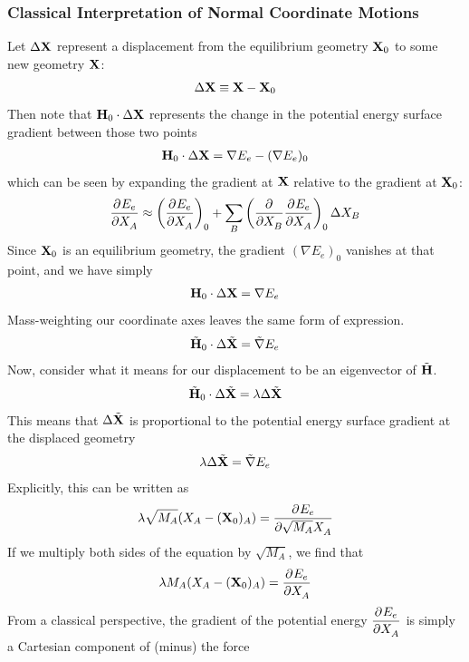 \documentclass[11pt]{article}
\begin{document}
\subsubsection{Classical Interpretation of Normal Coordinate Motions}
Let $\Delta\mathbf{X}$ represent a displacement from the equilibrium geometry
$\mathbf{X}_0$ to some new geometry $\mathbf{X}$:
\begin{align}
    \Delta\mathbf{X}
\equiv
    \mathbf{X}-\mathbf{X}_0
\end{align}
Then note that $\mathbf{H}_0\cdot\Delta\mathbf{X}$ represents the change in the potential
energy surface gradient between those two points
\begin{align*}
    \mathbf{H}_0\cdot\Delta\mathbf{X}
    = \nabla E_e - (\nabla E_e)_0
\end{align*}
which can be seen by expanding the gradient at $\mathbf{X}$ relative to the
gradient at $\mathbf{X}_0$:
\begin{align}
     \dfrac{ \partial^{} E_e }{\partial X_A ^{}}
    \approx \left( \dfrac{ \partial^{} E_e }{\partial X_A ^{}}\right)_0
            +\sum_B
            \left( \dfrac{ \partial^{}  }{\partial X_B ^{}} \dfrac{ \partial^{} E_e }{\partial X_A ^{}}\right)_0
            \Delta X_B
\end{align}
Since $\mathbf{X}_0$ is an equilibrium geometry, the gradient $(\nabla E_e)_0$
vanishes at that point, and we have simply
\begin{align*}
    \mathbf{H}_0\cdot\Delta\mathbf{X}
    = \nabla E_e
\end{align*}
Mass-weighting our coordinate axes leaves the same form of expression.
\begin{align*}
    \tilde{\mathbf{H}}_0\cdot\Delta\tilde{\mathbf{X}}
    = \tilde{\nabla} E_e
\end{align*}
Now, consider what it means for our displacement to be an eigenvector of
$\tilde{\mathbf{H}}$.
\begin{align}
    \tilde{\mathbf{H}}_0\cdot\Delta\tilde{\mathbf{X}}
    = \lambda \Delta\tilde{\mathbf{X}}
\end{align}
This means that $\Delta\tilde{\mathbf{X}}$ is proportional to the potential energy surface
gradient at the displaced geometry
\begin{align*}
    \lambda \Delta\tilde{\mathbf{X}}
    = \tilde{\nabla}E_e
\end{align*}
Explicitly, this can be written as
\begin{align*}
    \lambda \sqrt{M_A} (X_A-(\mathbf{X}_0)_A)
    =  \dfrac{ \partial^{} E_e }{\partial \sqrt{M_A}X_A ^{}}
\end{align*}
If we multiply both sides of the equation by $\sqrt{M_A}$, we find that
\begin{align}
    \lambda M_A (X_A-(\mathbf{X}_0)_A)
    =  \dfrac{ \partial^{} E_e }{\partial X_A ^{}}
\end{align}
From a classical perspective, the gradient of the potential energy {\small
$ \dfrac{ \partial^{} E_e }{\partial X_A ^{}}$} is simply a Cartesian component of (minus) the force
\end{document}
